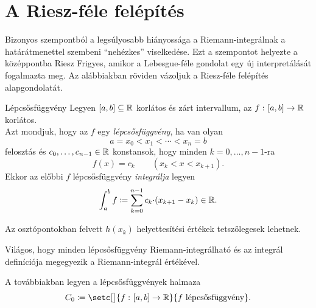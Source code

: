 \documentclass[
]{elteikthesis}[2024/04/26]
\begin{document}
	\section{A Riesz-féle felépítés}
	
	\indent 
	Bizonyos szempontból a legsúlyosabb hiányossága a Riemann-integrálnak
	a határátmenettel szembeni ``nehézkes'' viselkedése. 
	Ezt a szempontot helyezte a középpontba Riesz Frigyes, 
	amikor a Lebesgue-féle gondolat egy új interpretálását fogalmazta meg. 
	Az alábbiakban röviden vázoljuk a Riesz-féle felépítés alapgondolatát.
	
	\newpage
	\begin{definition}{Lépcsősfüggvény}{}
		Legyen \( [a,b] \subseteq \mathbb{R} \) korlátos és zárt intervallum, az
		\( f \,\colon [a, b] \to \mathbb{R} \) korlátos.\\[6pt]		
		Azt mondjuk, hogy az \( f \) egy \emph{lépcsősfüggvény}, ha van olyan
		\[
			a = x_0 < x_1 < \cdots < x_n = b
		\]
		felosztás és \( c_0, \dots, c_{n-1} \in \mathbb{R} \) konstansok, 
		hogy minden \( k = 0,\dots,n-1 \)-ra
		\[
			f(x) = c_k \qquad ( x_k < x < x_{k+1} ).
		\]
		Ekkor az előbbi \( f \) lépcsősfüggvény \emph{integrálja} legyen
		\[
			\int_a^b f \coloneq \sum_{k=0}^{n-1} c_k {\cdot} (x_{k + 1} - x_k) \in \mathbb{R}.
		\]
	\end{definition}
	
	\begin{notes}
		\item 
		Az osztópontokban felvett \( h(x_k) \) helyettesítési értékek tetszőlegesek lehetnek.
		
		\item
		Világos, hogy minden lépcsősfüggvény Riemann-integrálható és az integrál definíciója megegyezik a Riemann-integrál értékével.
	\end{notes}

	\noindent	
	A továbbiakban legyen a lépcsősfüggvények halmaza
	\[
		C_0 \coloneq
		\setc[\big]{ \func{f}{[a,b]}{\R} }{ f \text{ lépcsősfüggvény} }.
	\]
	
\end{document}
